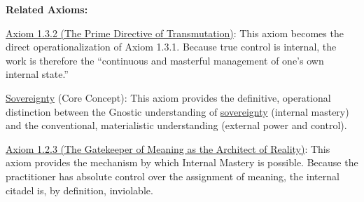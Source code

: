 \documentclass{article}
\begin{document}
\begin{nobullet}
    \item \textbf{Related Axioms:}
        \begin{nobullet}
            \item \hyperref[axiom_1_3_2_the_prime_directive_of_transmutation]{Axiom 1.3.2 (The Prime Directive of Transmutation)}: This axiom becomes the direct operationalization of Axiom 1.3.1. Because true control is internal, the work is therefore the ``continuous and masterful management of one's own internal state.''
            \item \hyperlink{gloss:sovereignty}{Sovereignty} (Core Concept): This axiom provides the definitive, operational distinction between the Gnostic understanding of \hyperlink{gloss:sovereignty}{sovereignty} (internal mastery) and the conventional, materialistic understanding (external power and control).
            \item \hyperref[axiom_1_2_3_the_gatekeeper_of_meaning_as_the_architect_of_reality]{Axiom 1.2.3 (The Gatekeeper of Meaning as the Architect of Reality)}: This axiom provides the mechanism by which Internal Mastery is possible. Because the practitioner has absolute control over the assignment of meaning, the internal citadel is, by definition, inviolable.
        \end{nobullet}

\end{nobullet}
\end{document}
